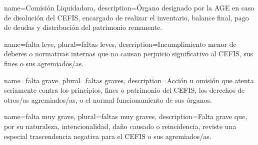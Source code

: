{
  name={Comisión Liquidadora},
  description={Órgano designado por la AGE en caso de disolución del CEFIS, encargado de realizar el inventario, balance final, pago de deudas y distribución del patrimonio remanente.}
}

{
  name={falta leve},
  plural={faltas leves},
  description={Incumplimiento menor de deberes o normativas internas que no causan perjuicio significativo al CEFIS, sus fines o sus agremiados/as.}
}

{
  name={falta grave},
  plural={faltas graves},
  description={Acción u omisión que atenta seriamente contra los principios, fines o patrimonio del CEFIS, los derechos de otros/as agremiados/as, o el normal funcionamiento de sus órganos.}
}

{
  name={falta muy grave},
  plural={faltas muy graves},
  description={Falta grave que, por su naturaleza, intencionalidad, daño causado o reincidencia, reviste una especial trascendencia negativa para el CEFIS o sus agremiados/as.}
}
